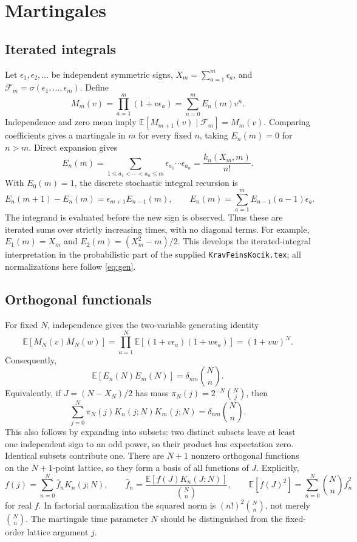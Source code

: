 \chapter{Martingales}
\label{ch:5}
\section{Iterated integrals}
\label{sec:5-1}
Let $\epsilon_1,\epsilon_2,\ldots$ be independent symmetric signs, $X_m=\sum_{a=1}^m\epsilon_a$, and $\mathcal F_m=\sigma(\epsilon_1,\ldots,\epsilon_m)$. Define
\[
M_m(v)=\prod_{a=1}^m(1+v\epsilon_a)=\sum_{n=0}^m E_n(m)v^n.
\]
Independence and zero mean imply $\mathbb E[M_{m+1}(v)\mid\mathcal F_m]=M_m(v)$. Comparing coefficients gives a martingale in $m$ for every fixed $n$, taking $E_n(m)=0$ for $n>m$. Direct expansion gives
\begin{equation}\label{eq:iterated-sign-sums}
E_n(m)=\sum_{1\le a_1<\cdots<a_n\le m}\epsilon_{a_1}\cdots\epsilon_{a_n}
=\frac{k_n(X_m,m)}{n!}.
\end{equation}
With $E_0(m)=1$, the discrete stochastic integral recursion is
\begin{equation}\label{eq:discrete-iterated-recursion}
E_n(m+1)-E_n(m)=\epsilon_{m+1}E_{n-1}(m),\qquad
E_n(m)=\sum_{a=1}^m E_{n-1}(a-1)\epsilon_a.
\end{equation}
The integrand is evaluated before the new sign is observed. Thus these are iterated sums over strictly increasing times, with no diagonal terms. For example, $E_1(m)=X_m$ and $E_2(m)=(X_m^2-m)/2$.
This develops the iterated-integral interpretation in the probabilistic part of the supplied \texttt{KravFeinsKocik.tex}; all normalizations here follow \eqref{eq:gen}.

\section{Orthogonal functionals}
\label{sec:5-2}
For fixed $N$, independence gives the two-variable generating identity
\[
\mathbb E[M_N(v)M_N(w)]=\prod_{a=1}^N\mathbb E[(1+v\epsilon_a)(1+w\epsilon_a)]=(1+vw)^N.
\]
Consequently,
\begin{equation}\label{eq:martingale-orthogonality}
\mathbb E[E_n(N)E_m(N)]=\delta_{nm}\binom Nn.
\end{equation}
Equivalently, if $J=(N-X_N)/2$ has mass $\pi_N(j)=2^{-N}\binom Nj$, then
\[
\sum_{j=0}^N\pi_N(j)K_n(j;N)K_m(j;N)=\delta_{nm}\binom Nn.
\]
This also follows by expanding into subsets: two distinct subsets leave at least one independent sign to an odd power, so their product has expectation zero. Identical subsets contribute one.
There are $N+1$ nonzero orthogonal functions on the $N+1$-point lattice, so they form a basis of all functions of $J$. Explicitly,
\[
f(j)=\sum_{n=0}^N\widehat f_nK_n(j;N),\qquad
\widehat f_n=\frac{\mathbb E[f(J)K_n(J;N)]}{\binom Nn},\qquad
\mathbb E[f(J)^2]=\sum_{n=0}^N\binom Nn\widehat f_n^2
\]
for real $f$. In factorial normalization the squared norm is $(n!)^2\binom Nn$, not merely $\binom Nn$. The martingale time parameter $N$ should be distinguished from the fixed-order lattice argument $j$.

